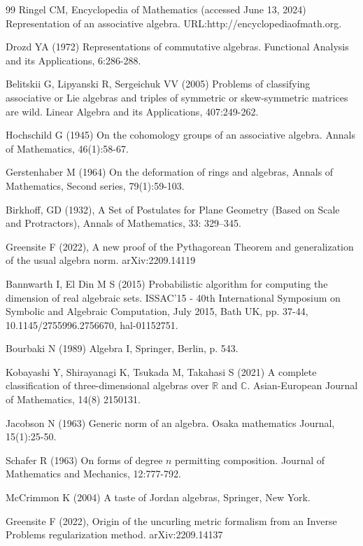 \documentclass{amsart}
\numberwithin{equation}{section}
\theoremstyle{definition}
\numberwithin{theorem}{section}
\begin{document}
   \begin{thebibliography}{99}
 Ringel CM, Encyclopedia of Mathematics (accessed June 13, 2024) Representation of an associative algebra. URL:http://encyclopediaofmath.org.
   
     Drozd YA (1972) Representations of commutative algebras. Functional Analysis and its Applications, 6:286-288.
          
        Belitskii G, Lipyanski R, Sergeichuk VV (2005) Problems of classifying associative or Lie algebras and triples of symmetric or skew-symmetric matrices are wild.  Linear Algebra and its Applications, 407:249-262.
       
        Hochschild G (1945) On the cohomology groups of an associative algebra.  Annals of Mathematics, 46(1):58-67.
       
             Gerstenhaber M (1964) On the deformation of rings and algebras, Annals of Mathematics, Second series, 79(1):59-103.
            
                      Birkhoff, GD (1932), A Set of Postulates for Plane Geometry (Based on Scale and Protractors), Annals of Mathematics, 33: 329–345.
         
                        Greensite F (2022), A new proof of the Pythagorean Theorem and generalization of the usual algebra norm. arXiv:2209.14119

               Bannwarth I, El Din M S (2015) Probabilistic algorithm for computing the dimension of real algebraic sets.  ISSAC'15 - 40th International Symposium on Symbolic and Algebraic Computation, July 2015, Bath UK, pp. 37-44, 10.1145/2755996.2756670, hal-01152751.
              
                  Bourbaki N (1989) Algebra I, Springer, Berlin, p. 543.           
       
               Kobayashi Y, Shirayanagi K, Tsukada M, Takahasi S (2021) A complete classification of three-dimensional algebras over $\mathbb{R}$ and $\mathbb{C}$. Asian-European Journal of Mathematics, 14(8) 2150131.                                        
   
               Jacobson N  (1963) Generic norm of an algebra. Osaka mathematics Journal, 15(1):25-50.
  
          Schafer R (1963) On forms of degree $n$ permitting composition. Journal of Mathematics and Mechanics, 12:777-792. 
         
      
        McCrimmon K (2004) A taste of Jordan algebras, Springer, New York.
       
                            Greensite F (2022), Origin of the uncurling metric formalism from an Inverse Problems regularization method. arXiv:2209.14137

              
      \end{thebibliography}

     
\end{document}

